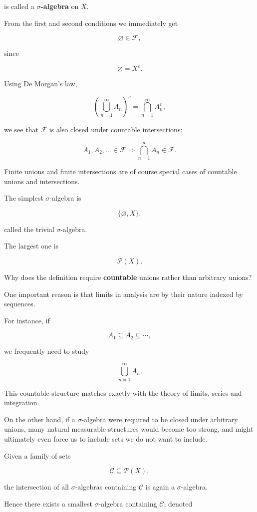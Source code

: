 \documentclass[11pt]{article}
\begin{document}
is called a \textbf{$\sigma$-algebra} on $X$.

From the first and second conditions we immediately get

\[
\varnothing\in\mathcal{F},
\]

since

\[
\varnothing=X^{c}.
\]

Using De Morgan's law,

\[
\left(\bigcup_{n=1}^{\infty}A_{n}\right)^{c}=\bigcap_{n=1}^{\infty}A_{n}^{c},
\]

we see that $\mathcal{F}$ is also closed under countable intersections:

\[
A_{1},A_{2},\ldots\in\mathcal{F}\Longrightarrow\bigcap_{n=1}^{\infty}A_{n}\in\mathcal{F}.
\]

Finite unions and finite intersections are of course special cases of countable unions and intersections.

The simplest $\sigma$-algebra is

\[
\{\varnothing,X\},
\]

called the trivial $\sigma$-algebra.

The largest one is

\[
\mathcal{P}(X).
\]

Why does the definition require \textbf{countable} unions rather than arbitrary unions?

One important reason is that limits in analysis are by their nature indexed by sequences.

For instance, if

\[
A_{1}\subseteq A_{2}\subseteq\cdots,
\]

we frequently need to study

\[
\bigcup_{n=1}^{\infty}A_{n}.
\]

This countable structure matches exactly with the theory of limits, series and integration.

On the other hand, if a $\sigma$-algebra were required to be closed under arbitrary unions, many natural measurable structures would become too strong, and might ultimately even force us to include sets we do not want to include.

Given a family of sets

\[
\mathcal{C}\subseteq\mathcal{P}(X),
\]

the intersection of all $\sigma$-algebras containing $\mathcal{C}$ is again a $\sigma$-algebra.

Hence there exists a smallest $\sigma$-algebra containing $\mathcal{C}$, denoted
\end{document}
